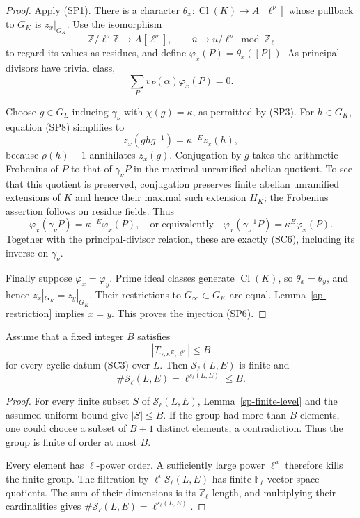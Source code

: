 \begin{proof}
Apply (SP1).  There is a character
$\theta_x:\operatorname{Cl}(K)\to A[\ell^\nu]$
whose pullback to $G_K$ is $z_x|_{G_K}$.
Use the isomorphism
\[
       \mathbb Z/\ell^\nu\mathbb Z
              \longrightarrow A[\ell^\nu],
       \qquad \overline u\longmapsto
                    u/\ell^\nu\bmod\mathbb Z_\ell
                    \tag{SP9}
\]
to regard its values as residues, and define
$\varphi_x(P)=\theta_x([P])$.
As principal divisors have trivial class,
\[
                       \sum_Pv_P(\alpha)\varphi_x(P)=0.
\]

Choose $g\in G_L$ inducing $\gamma_\nu$ with $\chi(g)=\kappa$,
as permitted by (SP3).
For $h\in G_K$, equation (SP8) simplifies to
\[
                         z_x(ghg^{-1})=\kappa^{-E}z_x(h),
                         \tag{SP10}
\]
because $\rho(h)-1$ annihilates $z_x(g)$.
Conjugation by $g$ takes the arithmetic Frobenius of $P$
to that of $\gamma_\nu P$ in the maximal unramified
abelian quotient.  To see that this quotient is preserved,
conjugation preserves finite abelian unramified extensions
of $K$ and hence their maximal such extension $H_K$;
the Frobenius assertion follows on residue fields.
Thus
\[
                \varphi_x(\gamma_\nu P)
                         =\kappa^{-E}\varphi_x(P),
 \quad\text{or equivalently}\quad
                \varphi_x(\gamma_\nu^{-1}P)
                         =\kappa^E\varphi_x(P).
\]
Together with the principal-divisor relation, these are
exactly (SC6), including its inverse on $\gamma_\nu$.

Finally suppose $\varphi_x=\varphi_y$.
Prime ideal classes generate $\operatorname{Cl}(K)$,
so $\theta_x=\theta_y$, and hence
$z_x|_{G_K}=z_y|_{G_K}$.
Their restrictions to $G_\infty\subset G_K$ are equal.
Lemma~\ref{sp-restriction} implies $x=y$.
This proves the injection (SP6).
\end{proof}

\begin{theorem}\label{sp-sha}
Assume that a fixed integer $B$ satisfies
\[
                   |T_{\gamma,\kappa^E,\ell^\nu}|\le B
\]
for every cyclic datum (SC3) over $L$.
Then $\mathcal S_\ell(L,E)$ is finite and
\[
              \#\mathcal S_\ell(L,E)
                    =\ell^{s_\ell(L,E)}\le B.
                    \tag{SP11}
\]
\end{theorem}
\begin{proof}
For every finite subset $S$ of $\mathcal S_\ell(L,E)$,
Lemma~\ref{sp-finite-level} and the assumed uniform bound
give $|S|\le B$.
If the group had more than $B$ elements, one could choose
a subset of $B+1$ distinct elements, a contradiction.
Thus the group is finite of order at most $B$.

Every element has $\ell$-power order.  A sufficiently
large power $\ell^a$ therefore kills the finite group.
The filtration by $\ell^i\mathcal S_\ell(L,E)$ has finite
$\mathbb F_\ell$-vector-space quotients.  The sum of their
dimensions is its $\mathbb Z_\ell$-length, and multiplying
their cardinalities gives
$\#\mathcal S_\ell(L,E)=\ell^{s_\ell(L,E)}$.
\end{proof}

